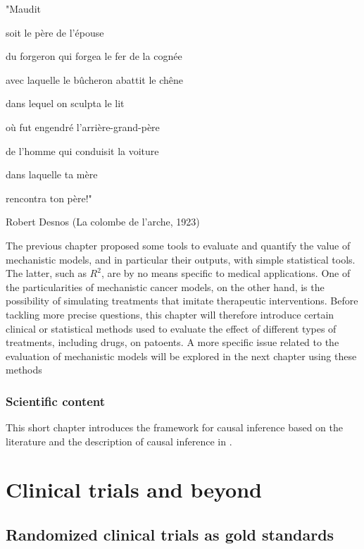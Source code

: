 \documentclass[a4paper,12pt,twoside,onecolumn,openright,final,oldfontcommands]{memoir}
\newcommand{\initial}[1]{
	\lettrine[lines=3,lhang=0.33,nindent=0em]{
		\color{gray}
     		{\textsc{#1}}}{}}
\let\BeginKnitrBlock\begin \let\EndKnitrBlock\end
\begin{document}
\epigraph{"Maudit

soit le père de l'épouse

du forgeron qui forgea le fer de la cognée

avec laquelle le bûcheron abattit le chêne

dans lequel on sculpta le lit

où fut engendré l'arrière-grand-père

de l'homme qui conduisit la voiture

dans laquelle ta mère

rencontra ton père!"}{Robert Desnos (La colombe de l'arche, 1923)}

\initial{T}he previous chapter proposed some tools to evaluate and
quantify the value of mechanistic models, and in particular their
outputs, with simple statistical tools. The latter, such as \(R^2\), are
by no means specific to medical applications. One of the particularities
of mechanistic cancer models, on the other hand, is the possibility of
simulating treatments that imitate therapeutic interventions. Before
tackling more precise questions, this chapter will therefore introduce
certain clinical or statistical methods used to evaluate the effect of
different types of treatments, including drugs, on patoents. A more
specific issue related to the evaluation of mechanistic models will be
explored in the next chapter using these methods

\BeginKnitrBlock{summarybox}
\subsubsection*{Scientific content}\label{scientific-content-5}

This short chapter introduces the framework for causal inference based
on the literature and the description of causal inference in
\citet{beal2020causal}.
\EndKnitrBlock{summarybox}

\newcommand{\indep}{\perp \!\!\! \perp}

\section{Clinical trials and beyond}\label{clinical-trials-and-beyond}

\subsection{Randomized clinical trials as gold
standards}\label{randomized-clinical-trials-as-gold-standards}
\end{document}

